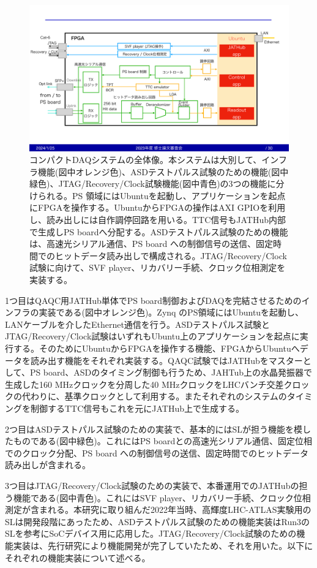 \begin{figure} 
\centering
\includegraphics[width=16cm]{fig/QAQC/QAQCoverall.pdf}
\caption[コンパクトDAQシステムの全体像]{コンパクトDAQシステムの全体像。本システムは大別して、インフラ機能(図中オレンジ色)、ASDテストパルス試験のための機能(図中緑色)、JTAG/Recovery/Clock試験機能(図中青色)の3つの機能に分けられる。PS 領域にはUbuntuを起動し、アプリケーションを起点にFPGAを操作する。UbuntuからFPGAの操作はAXI GPIOを利用し、読み出しには自作調停回路を用いる。TTC信号もJATHub内部で生成しPS boardへ分配する。ASDテストパルス試験のための機能は、高速光シリアル通信、PS board への制御信号の送信、固定時間でのヒットデータ読み出しで構成される。JTAG/Recovery/Clock試験に向けて、SVF player、リカバリー手続、クロック位相測定を実装する。}
\label{QAQCoverall}
\end{figure}

1つ目はQAQC用JATHub単体でPS board制御およびDAQを完結させるためのインフラの実装である(図中オレンジ色)。Zynq のPS領域にはUbuntuを起動し、LANケーブルを介したEthernet通信を行う。ASDテストパルス試験とJTAG/Recovery/Clock試験はいずれもUbuntu上のアプリケーションを起点に実行する。そのためにUbuntuからFPGAを操作する機能、FPGAからUbuntuへデータを読み出す機能をそれぞれ実装する。QAQC試験ではJATHubをマスターとして、PS board、ASDのタイミング制御も行うため、JAHTub上の水晶発振器で生成した160 MHzクロックを分周した40 MHzクロックをLHCバンチ交差クロックの代わりに、基準クロックとして利用する。またそれぞれのシステムのタイミングを制御するTTC信号もこれを元にJATHub上で生成する。

2つ目はASDテストパルス試験のための実装で、基本的にはSLが担う機能を模したものである(図中緑色)。これにはPS boardとの高速光シリアル通信、固定位相でのクロック分配、PS board への制御信号の送信、固定時間でのヒットデータ読み出しが含まれる。

3つ目はJTAG/Recovery/Clock試験のための実装で、本番運用でのJATHubの担う機能である(図中青色)。これにはSVF player、リカバリー手続、クロック位相測定が含まれる。本研究に取り組んだ2022年当時、高輝度LHC-ATLAS実験用のSLは開発段階にあったため、ASDテストパルス試験のための機能実装はRun3のSLを参考にSoCデバイス用に応用した。JTAG/Recovery/Clock試験のための機能実装は、先行研究\cite{mt_atanaka}により機能開発が完了していたため、それを用いた。以下にそれぞれの機能実装について述べる。

